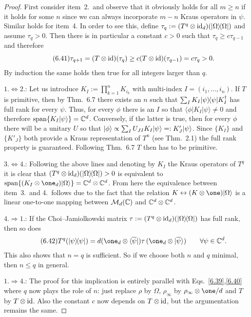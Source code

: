 \documentclass[11pt,a4paper]{article}
\theoremstyle{plain}
\theoremstyle{definition}
\theoremstyle{remark}
\begin{document}
\begin{proof}
    First consider item~2.\ and observe that it obviously holds for all $m\ge n$ if
    it holds for some $n$ since we can always incorporate $m-n$ Kraus operators in
    $\psi$. Similar holds for item~4. In order to see this, define
    $\tau_q:=(T^q\otimes \mathrm{id}_d)(|\Omega\rangle\!\langle\Omega|)$ and assume $\tau_q>0$.
    Then there is in particular a constant $c>0$ such that $\tau_q\ge c\tau_{q-1}$
    and therefore
    \begin{equation}\tag{6.41}
        \tau_{q+1}
        = (T\otimes \mathrm{id})(\tau_q)
        \ge c(T\otimes \mathrm{id})(\tau_{q-1})
        = c\tau_q>0.
    \end{equation}
    By induction the same holds then true for all integers larger than $q$.

    \noindent
    $1.\Leftrightarrow 2$.:
    Let us introduce $K_I:=\prod_{k=1}^n K_{i_k}$ with multi-index
    $I=(i_1,\dots,i_n)$. If $T$ is primitive, then by Thm.~6.7 there exists an $n$
    such that $\sum_I K_I|\psi\rangle\!\langle\psi|K_I^\dagger$ has full rank for every
    $\psi$. Thus, for every $\phi$ there is an $I$ so that
    $\langle\phi|K_I|\psi\rangle\neq 0$ and therefore
    $\operatorname{span}\{K_I|\psi\rangle\}=\mathbb{C}^d$. Conversely, if the latter is true, then for every
    $\phi$ there will be a unitary $U$ so that
    $|\phi\rangle\propto \sum_I U_{JI}K_I|\psi\rangle=:K'_J|\psi\rangle$. Since $\{K_I\}$
    and $\{K'_J\}$ both provide a Kraus representation of $T^n$ (see Thm.~2.1) the
    full rank property is guaranteed. Following Thm.~6.7 $T$ then has to be
    primitive.

    \noindent
    $3.\Leftrightarrow 4$.:
    Following the above lines and denoting by $K_I$ the Kraus operators of $T^q$ it
    is clear that $(T^q\otimes \mathrm{id}_d)(|\Omega\rangle\!\langle\Omega|)>0$ is equivalent to
    $\spn\{(K_I\otimes \one_d)\ket{\Omega}\}=\CC^d\otimes \CC^d$. From here the
    equivalence between item~3.\ and 4.\ follows due to the fact that the relation
    $K\leftrightarrow (K\otimes \one)\ket{\Omega}$ is a linear one-to-one mapping
    between $\mathcal{M}_d(\mathbb{C})$ and $\mathbb{C}^d\otimes \mathbb{C}^d$.

    \noindent
    $4.\Rightarrow 1$.:
    If the Choi--Jamiolkowski matrix
    $\tau:=(T^q\otimes \mathrm{id}_d)(|\Omega\rangle\!\langle\Omega|)$ has full rank, then so
    does
    \begin{equation}\tag{6.42}
        T^q(\ket{\psi}\!\bra{\psi})
        = d(\one_d\otimes \bra{\overline{\psi}}) \tau\,(\one_d\otimes \ket{\overline{\psi}})
        \qquad \forall \psi\in\CC^d.
    \end{equation}
    This also shows that $n=q$ is sufficient. So if we choose both $n$ and $q$
    minimal, then $n\le q$ in general.

    \noindent
    $1.\Rightarrow 4$.:
    The proof for this implication is entirely parallel with
    Eqs.~\eqref{6.39},\eqref{6.40} where $q$ now plays the role of $n$: just replace
    $\rho$ by $\Omega$, $\rho_\infty$ by $\rho_\infty\otimes \one/d$ and $T$ by
    $T\otimes \mathrm{id}$. Also the constant $c$ now depends on $T\otimes \mathrm{id}$, but the
    argumentation remains the same.
\end{proof}
\end{document}
